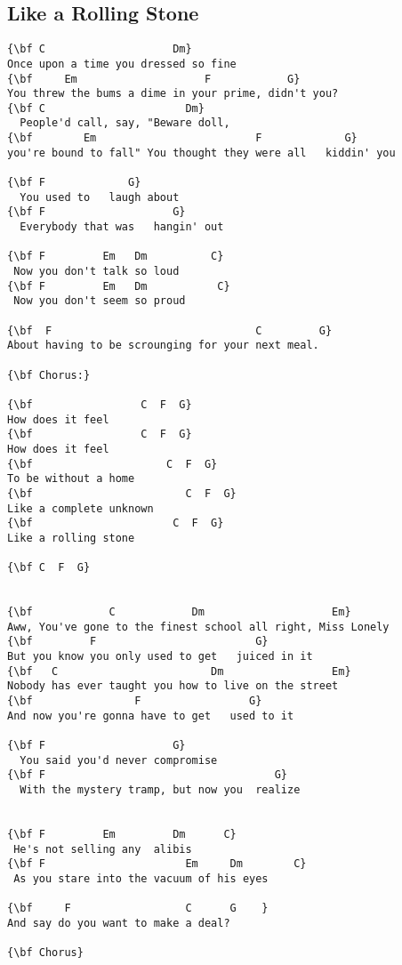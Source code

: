 \documentclass[a4paper]{article}
\begin{document}
\subsection{Like a Rolling Stone} %
\label{sub:Like a Rolling Stone}
\begin{Verbatim}[commandchars=\\\{\}]
{\bf C                    Dm}
Once upon a time you dressed so fine
{\bf     Em                    F            G}
You threw the bums a dime in your prime, didn't you?
{\bf C                      Dm}
  People'd call, say, "Beware doll, 
{\bf        Em                         F             G}
you're bound to fall" You thought they were all   kiddin' you

{\bf F             G}
  You used to   laugh about
{\bf F                    G}
  Everybody that was   hangin' out

{\bf F         Em   Dm          C}
 Now you don't talk so loud
{\bf F         Em   Dm           C}
 Now you don't seem so proud

{\bf  F                                C         G}
About having to be scrounging for your next meal.

{\bf Chorus:}

{\bf                 C  F  G}
How does it feel
{\bf                 C  F  G}
How does it feel
{\bf                     C  F  G}
To be without a home
{\bf                        C  F  G}
Like a complete unknown
{\bf                      C  F  G}
Like a rolling stone

{\bf C  F  G}


{\bf            C            Dm                    Em}
Aww, You've gone to the finest school all right, Miss Lonely
{\bf         F                         G}
But you know you only used to get   juiced in it
{\bf   C                        Dm                 Em}
Nobody has ever taught you how to live on the street
{\bf                F                 G}
And now you're gonna have to get   used to it

{\bf F                    G}
  You said you'd never compromise
{\bf F                                    G}
  With the mystery tramp, but now you  realize


{\bf F         Em         Dm      C}
 He's not selling any  alibis
{\bf F                      Em     Dm        C}
 As you stare into the vacuum of his eyes

{\bf     F                  C      G    }
And say do you want to make a deal?

{\bf Chorus}


\end{Verbatim}
\end{document}

